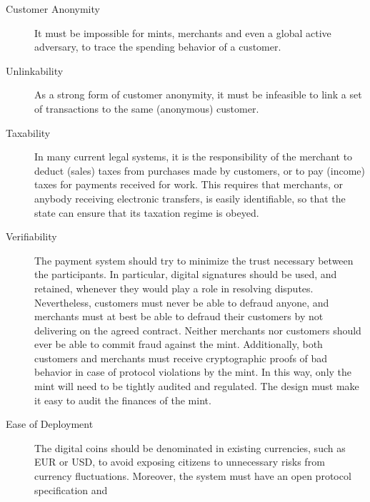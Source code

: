\documentclass{llncs}
\begin{document}
\begin{description}
  \item[Customer Anonymity] 
    It must be impossible for mints, merchants and even a global active
    adversary, to trace the spending behavior of a customer.  
  \item[Unlinkability]
    As a strong form of customer anonymity, it must be infeasible to
    link a set of transactions to the same (anonymous) customer.
  \item[Taxability] 
    In many current legal systems, it is the responsibility of the merchant
    to deduct (sales) taxes from purchases made by customers, or to
    pay (income) taxes for payments received for work.
    This requires that merchants, or anybody receiving electronic transfers,
    is easily identifiable, so that the state can ensure that its
    taxation regime is obeyed.
  \item[Verifiability] 
    The payment system should try to minimize the trust necessary between
    the participants.  In particular, digital signatures should be used,
    and retained, whenever they would play a role in resolving disputes. %
    Nevertheless, customers must never be able to defraud anyone, and
    merchants must at best be able to defraud their customers by not
    delivering on the agreed contract.  Neither merchants nor customers
    should ever be able to commit fraud against the mint.  Additionally,
    both customers and merchants must receive cryptographic proofs of
    bad behavior in case of protocol violations by the mint.  
    In this way, only the mint will need to be tightly audited and regulated.
    The design must make it easy to audit the finances of the mint.
  \item[Ease of Deployment] %
    The digital coins should be denominated in existing currencies,
    such as EUR or USD, to avoid exposing citizens to unnecessary risks
    from currency fluctuations.
    Moreover, the system must have an open protocol specification and

\end{description}
\end{document}
